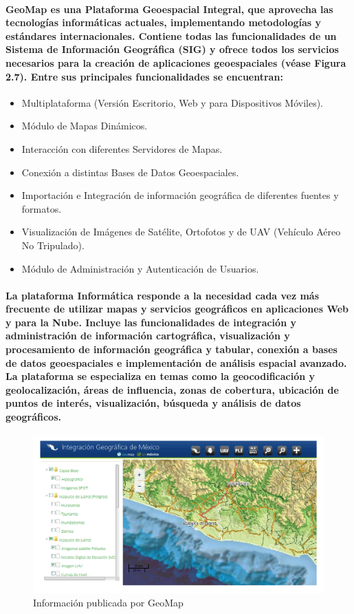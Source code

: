    \paragraph{GeoMap es una Plataforma Geoespacial Integral, que aprovecha las tecnologías informáticas actuales, implementando metodologías y estándares internacionales. Contiene todas las funcionalidades de un Sistema de Información Geográfica (SIG) y ofrece todos los servicios necesarios para la creación de aplicaciones geoespaciales (véase Figura 2.7).  Entre sus principales funcionalidades se encuentran: }
    \begin{itemize}
      \item Multiplataforma (Versión Escritorio, Web y para Dispositivos Móviles).
      \item Módulo de Mapas Dinámicos.
      \item Interacción con diferentes Servidores de Mapas.
      \item Conexión a distintas Bases de Datos Geoespaciales.
      \item Importación e Integración de información geográfica de diferentes fuentes y formatos.
      \item Visualización de Imágenes de Satélite, Ortofotos y de UAV (Vehículo Aéreo No Tripulado).
      \item Módulo de Administración y Autenticación de Usuarios. 
    \end{itemize}
    \paragraph{La plataforma Informática responde a la necesidad cada vez más frecuente de utilizar mapas y servicios geográficos en aplicaciones Web y para la Nube. Incluye las funcionalidades de integración y administración de información cartográfica, visualización y procesamiento de información geográfica y tabular, conexión a bases de datos geoespaciales e implementación de análisis espacial avanzado. La plataforma se especializa en temas como la geocodificación y geolocalización, áreas de influencia, zonas de cobertura, ubicación de puntos de interés, visualización, búsqueda y análisis de datos geográficos.}
    \begin{figure}[h!]
      \centering
        \includegraphics[width=\textwidth]{./images/GeoMap.png}
      \caption{Información publicada por GeoMap}
    \end{figure}
